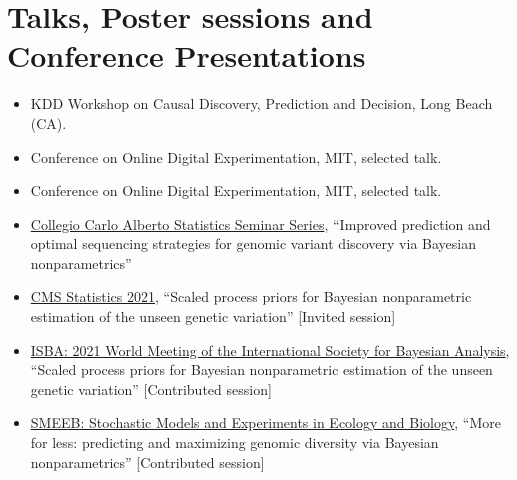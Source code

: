 \documentclass[10pt, a4paper]{article}
\newcommand{\years}[1]{\marginnote{\scriptsize #1}}
\begin{document}
\section*{Talks, Poster sessions and Conference Presentations}
\years{2023}
\begin{itemize}
	\item KDD Workshop on Causal Discovery, Prediction and Decision, Long Beach (CA).
	\item Conference on Online Digital Experimentation, MIT, selected talk.
\end{itemize}
\years{2022}
\begin{itemize}
	\item Conference on Online Digital Experimentation, MIT, selected talk.
\end{itemize}
\years{2021}
\begin{itemize}
	\item \href{https://www.carloalberto.org/event/lorenzo-masoero-amazon/}{Collegio Carlo Alberto Statistics Seminar Series}, ``{Improved prediction and optimal sequencing strategies for genomic variant discovery via Bayesian nonparametrics}''  
	\item \href{http://www.cmstatistics.org/CMStatistics2021/speakers.php}{CMS Statistics 2021}, ``{Scaled process priors for Bayesian nonparametric
estimation of the unseen genetic variation}'' [Invited session] 
	\item \href{https://events.stat.uconn.edu/ISBA2021/}{ISBA: 2021 World Meeting of the International Society for Bayesian Analysis}, ``{Scaled process priors for Bayesian nonparametric
estimation of the unseen genetic variation}'' [Contributed session] 
	\item \href{https://liphlab.github.io/SMEEB2021/}{SMEEB: Stochastic Models and Experiments in Ecology and Biology}, ``{More for less: predicting and maximizing genomic diversity via Bayesian nonparametrics}'' [Contributed session] 
\end{itemize}
\years{2020}
\end{document}
